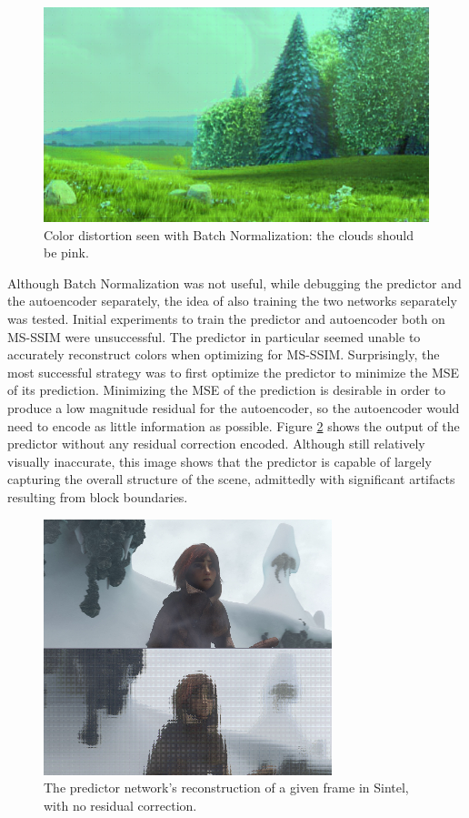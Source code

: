 \documentclass[10pt,twocolumn,letterpaper]{article}
\begin{document}
\begin{figure}[t]
\begin{center}
  \includegraphics[width=0.8\linewidth]{green}
\end{center}
   \caption{Color distortion seen with Batch Normalization: the clouds should be pink.}
   \label{fig:monochrome}
\end{figure}

Although Batch Normalization was not useful, while debugging the predictor and the autoencoder separately, the idea of also training the two networks separately was tested. Initial experiments to train the predictor and autoencoder both on MS-SSIM were unsuccessful. The predictor in particular seemed unable to accurately reconstruct colors when optimizing for MS-SSIM. Surprisingly, the most successful strategy was to first optimize the predictor to minimize the MSE of its prediction. Minimizing the MSE of the prediction is desirable in order to produce a low magnitude residual for the autoencoder, so the autoencoder would need to encode as little information as possible. Figure \ref{fig:noauto} shows the output of the predictor without any residual correction encoded. Although still relatively visually inaccurate, this image shows that the predictor is capable of largely capturing the overall structure of the scene, admittedly with significant artifacts resulting from block boundaries.
\begin{figure}[t]
\begin{center}
  \includegraphics[width=0.8\linewidth]{noauto}
\end{center}
   \caption{The predictor network's reconstruction of a given frame in Sintel, with no residual correction.}
   \label{fig:noauto}
\end{figure}
\end{document}
